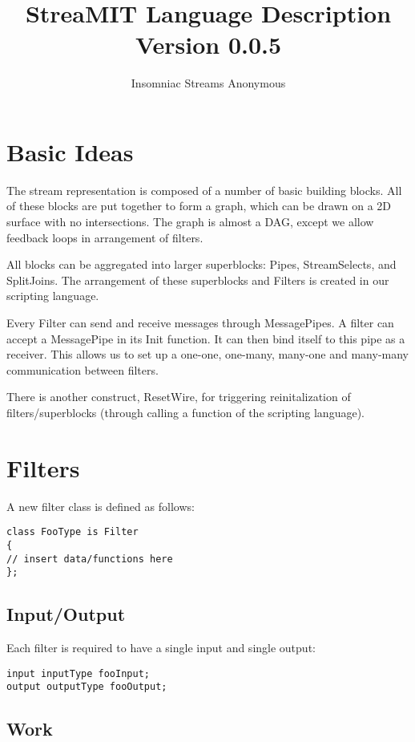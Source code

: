 \documentclass[twocolumn, draft]{article}
\title{StreaMIT Language Description \\ Version 0.0.5}
\author{Insomniac Streams Anonymous}
\begin{document}
\maketitle

\section{Basic Ideas}

The stream representation is composed of a number of basic building blocks.
All of these blocks are put together to form a graph, which can be drawn
on a 2D surface with no intersections.  The graph is almost a DAG, except
we allow feedback loops in arrangement of filters.

All blocks can be aggregated into larger superblocks:  Pipes, StreamSelects,
and SplitJoins.  The arrangement of these superblocks and
Filters is created in our scripting language.

Every Filter can send and receive messages through MessagePipes.  A filter 
can accept a MessagePipe in its Init function.  It can then bind itself
to this pipe as a receiver.  This allows us to set up a one-one,
one-many, many-one and many-many communication between filters.

There is another construct, ResetWire, for triggering reinitalization of 
filters/superblocks (through calling a function of the scripting language).

\section{Filters}
A new filter class is defined as follows:

\begin{verbatim}
class FooType is Filter
{
// insert data/functions here
};
\end{verbatim}

\subsection{Input/Output}

Each filter is required to have a single input and single output:
\begin{verbatim}
input inputType fooInput;
output outputType fooOutput;
\end{verbatim}

\subsection{Work}
\end{document}
